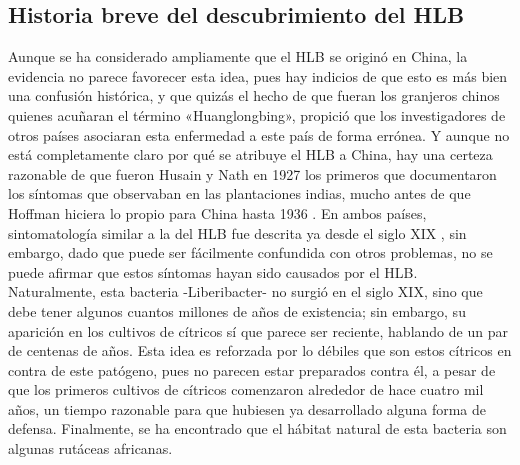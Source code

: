 \subsection{Historia breve del descubrimiento del HLB}
Aunque se ha considerado ampliamente que el HLB se originó en China, la evidencia no parece favorecer esta idea, pues hay indicios de que esto es más bien una confusión histórica, y que quizás el hecho de que fueran los granjeros chinos quienes acuñaran el término «Huanglongbing», propició que los investigadores de otros países asociaran esta enfermedad a este país de forma errónea. Y aunque no está completamente claro por qué se atribuye el HLB a China, hay una certeza razonable de que fueron Husain y Nath en 1927 \cite{chohan2007molecular} los primeros que documentaron los síntomas que observaban en las plantaciones indias, mucho antes de que Hoffman hiciera lo propio para China hasta 1936 \cite{hoffmann1936congenital}. En ambos países, sintomatología similar a la del HLB fue descrita ya desde el siglo XIX \cite{da2010etiology}, sin embargo, dado que puede ser fácilmente confundida con otros problemas, no se puede afirmar que estos síntomas hayan sido causados por el HLB.\\
Naturalmente, esta bacteria -Liberibacter- no surgió en el siglo XIX, sino que debe tener algunos cuantos millones de años de existencia; sin embargo, su aparición en los cultivos de cítricos sí que parece ser reciente, hablando de un par de centenas de años. Esta idea es reforzada por lo débiles que son estos cítricos en contra de este patógeno, pues no parecen estar preparados contra él, a pesar de que los primeros cultivos de cítricos comenzaron alrededor de hace cuatro mil años, un tiempo razonable para que hubiesen ya desarrollado alguna forma de defensa. Finalmente, se ha encontrado que el hábitat natural de esta bacteria son algunas rutáceas africanas.\cite{da2008biology}\\

